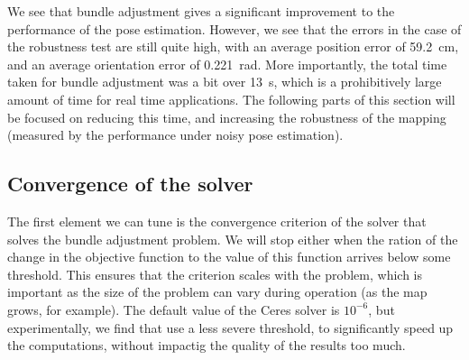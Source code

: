We see that bundle adjustment gives a significant improvement to the performance of the pose estimation. However, we see that the errors in the case of the robustness test are still quite high, with an average position error of \SI{59.2}{\centi\meter}, and an average orientation error of \SI{0.221}{\radian}. More importantly, the total time taken for bundle adjustment was a bit over \SI{13}{\second}, which is a prohibitively large amount of time for real time applications. The following parts of this section will be focused on reducing this time, and increasing the robustness of the mapping (measured by the performance under noisy pose estimation).

\subsection{Convergence of the solver}
The first element we can tune is the convergence criterion of the solver that solves the bundle adjustment problem. We will stop either when the ration of the change in the objective function to the value of this function arrives below some threshold. This ensures that the criterion scales with the problem, which is important as the size of the problem can vary during operation (as the map grows, for example). The default value of the Ceres solver is $10^{-6}$, but experimentally, we find that use a less severe threshold, to significantly speed up the computations, without impactig the quality of the results too much.
